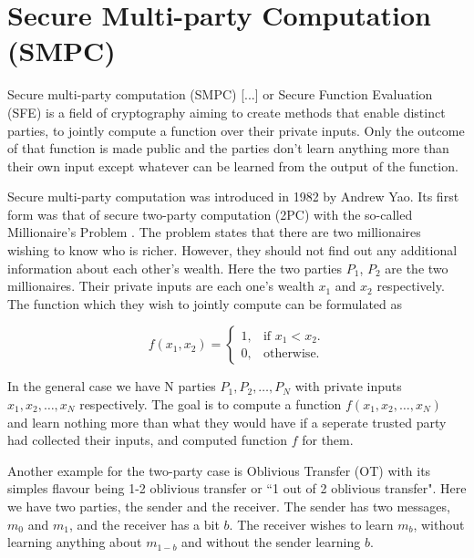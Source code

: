 \section{Secure Multi-party Computation (SMPC)}\label{s:smpc}
Secure multi-party computation (SMPC) [...] or Secure Function Evaluation (SFE) is a field of cryptography aiming to create methods that enable distinct parties, to jointly compute a function over their private inputs.
Only the outcome of that function is made public and the parties don’t learn anything more than their own input except whatever can be learned from the output of the function.

Secure multi-party computation was introduced in 1982 by Andrew Yao.
Its first form was that of secure two-party computation (2PC) with the so-called Millionaire's Problem \cite{yao1982protocols}.
The problem states that there are two millionaires wishing to know who is richer.
However, they should not find out any additional information about each other’s wealth.
Here the two parties $P_1$, $P_2$ are the two millionaires.
Their private inputs are each one’s wealth $x_1$ and $x_2$ respectively.
The function which they wish to jointly compute can be formulated as 

\begin{equation}
  f(x_1, x_2)=\begin{cases}
    1, & \text{if $x_1 < x_2$}.\\
    0, & \text{otherwise}.
  \end{cases}
\end{equation}

In the general case we have N parties $P_1, P_2, \dots, P_N$ with private inputs $x_1, x_2, \dots, x_N$ respectively.
The goal is to compute a function $f(x_1, x_2, \dots, x_N)$ and learn nothing more than what they would have if a seperate trusted party had collected their inputs, and computed function $f$ for them.

Another example for the two-party case is Oblivious Transfer (OT) \cite{rabin2005exchange} with its simples flavour being 1-2 oblivious transfer or ``1 out of 2 oblivious transfer".
Here we have two parties, the sender and the receiver.
The sender has two messages, $m_0$ and $m_1$, and the receiver has a bit $b$.
The receiver wishes to learn $m_b$, without learning anything about $m_{1-b}$ and without the sender learning $b$.
